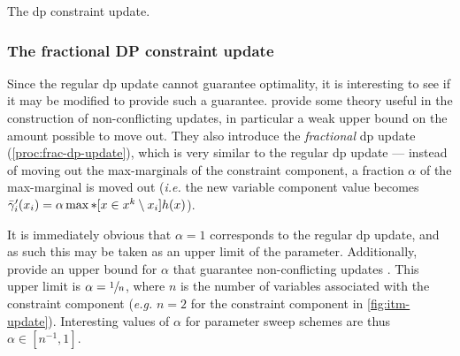 \begin{algorithm}[tbp]
	
	\caption{
		The \gls{dp} constraint update.
	}
	\label{proc:dp-update}
\end{algorithm}

\subsubsection{The fractional DP constraint update}
Since the regular \gls{dp} update cannot guarantee optimality, it is interesting to see if it may be modified to provide such a guarantee.
\Textcite[\pno~105\psqq]{Wedelin08} provide some theory useful in the construction of non-conflicting updates, in particular a weak upper bound on the amount possible to move out.
They also introduce the \emph{fractional} \gls{dp} update (\cref{proc:frac-dp-update}), which is very similar to the regular \gls{dp} update --- instead of moving out the max-marginals of the constraint component, a fraction \(\alpha\) of the max-marginal is moved out (\emph{i.e.} the new variable component value becomes \(\bar{\gamma}'_i(x_i) = \alpha\max*[x\in x^k\setminus x_i]{h(x)}\)).

It is immediately obvious that \(\alpha=1\) corresponds to the regular \gls{dp} update, and as such this may be taken as an upper limit of the parameter.
Additionally, \textcite{Wedelin08} provide an upper bound for \(\alpha\) that guarantee non-conflicting updates \parencite[\pno~107]{Wedelin08}.
This upper limit is \(\alpha=\sfrac{1}{n}\), where \(n\) is the number of variables associated with the constraint component (\emph{e.g.} \(n=2\) for the constraint component in \cref{fig:itm-update}).
Interesting values of \(\alpha\) for parameter sweep schemes are thus \(\alpha\in[n^{-1},1]\).

